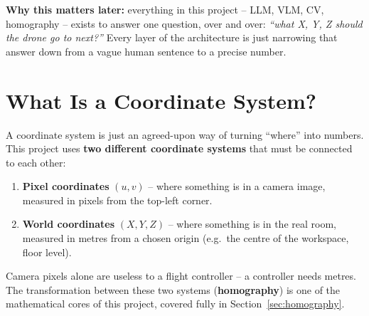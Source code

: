 \documentclass[11pt,a4paper]{article}
\begin{document}
\begin{quotebox}
\textbf{Why this matters later:} everything in this project -- LLM, VLM, CV, homography -- exists
to answer one question, over and over: \emph{``what X, Y, Z should the drone go to next?''}
Every layer of the architecture is just narrowing that answer down from a vague human sentence to
a precise number.
\end{quotebox}

\section{What Is a Coordinate System?}

A coordinate system is just an agreed-upon way of turning ``where'' into numbers. This project
uses \textbf{two different coordinate systems} that must be connected to each other:

\begin{enumerate}[itemsep=3pt]
\item \textbf{Pixel coordinates} $(u,v)$ -- where something is in a camera image, measured in
pixels from the top-left corner.
\item \textbf{World coordinates} $(X,Y,Z)$ -- where something is in the real room, measured in
metres from a chosen origin (e.g.\ the centre of the workspace, floor level).
\end{enumerate}

\begin{center}
\end{center}

Camera pixels alone are useless to a flight controller -- a controller needs metres. The
transformation between these two systems (\textbf{homography}) is one of the mathematical cores
of this project, covered fully in Section~\ref{sec:homography}.
\end{document}

